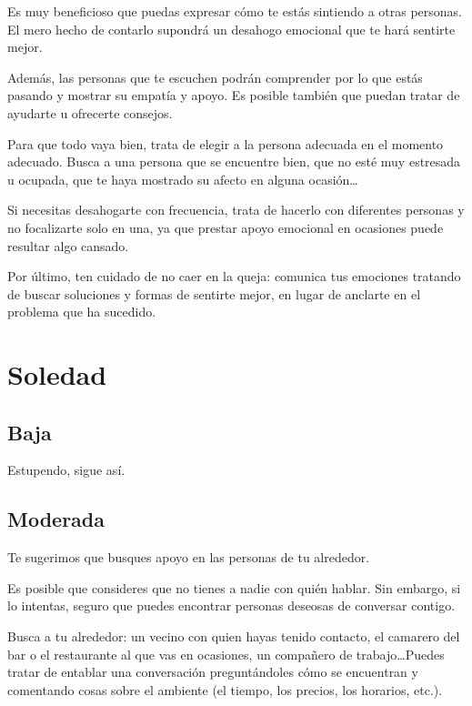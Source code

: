             Es muy beneficioso que puedas expresar cómo te estás sintiendo a otras personas. El mero hecho de 
            contarlo supondrá un desahogo emocional que te hará sentirte mejor.
            
            Además, las personas que te escuchen podrán comprender por lo que estás pasando y mostrar su empatía 
            y apoyo. Es posible también que puedan tratar de ayudarte u ofrecerte consejos.
            
            Para que todo vaya bien, trata de elegir a la persona adecuada en el momento adecuado. Busca a una 
            persona que se encuentre bien, que no esté muy estresada u ocupada, que te haya mostrado su afecto 
            en alguna ocasión…
            
            Si necesitas desahogarte con frecuencia, trata de hacerlo con diferentes personas y no focalizarte 
            solo en una, ya que prestar apoyo emocional en ocasiones puede resultar algo cansado.
           
            Por último, ten cuidado de no caer en la queja: comunica tus emociones tratando de buscar soluciones 
            y formas de sentirte mejor, en lugar de anclarte en el problema que ha sucedido.

    \section{Soledad}
        \subsection{Baja}
            Estupendo, sigue así. 
        \subsection{Moderada}
            Te sugerimos que busques apoyo en las personas de tu alrededor.

            Es posible que consideres que no tienes a nadie con quién hablar. Sin embargo, si lo intentas, seguro 
            que puedes encontrar personas deseosas de conversar contigo.
            
            Busca a tu alrededor: un vecino con quien hayas tenido contacto, el camarero del bar o el restaurante 
            al que vas en ocasiones, un compañero de trabajo…Puedes tratar de entablar una conversación 
            preguntándoles cómo se encuentran y comentando cosas sobre el ambiente (el tiempo, los precios, 
            los horarios, etc.).
            
